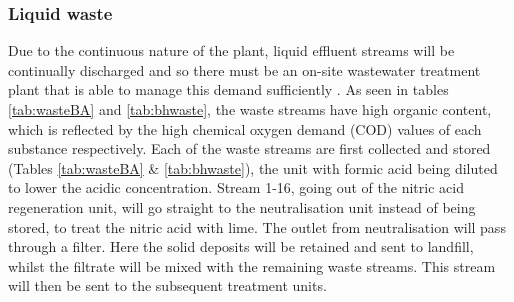 \subsubsection{Liquid waste }

Due to the continuous nature of the plant, liquid effluent streams will be continually discharged and so there must be an on-site wastewater treatment plant that is able to manage this demand sufficiently \cite{water_innovations_inc_continuous_2021}.  As seen in tables \ref{tab:wasteBA} and \ref{tab:bhwaste}, the waste streams have high organic content, which is reflected by the high chemical oxygen demand (COD) values of each substance respectively. Each of the waste streams are first collected and stored (Tables \ref{tab:wasteBA} \& \ref{tab:bhwaste}), the unit with formic acid being diluted to lower the acidic concentration. Stream 1-16, going out of the nitric acid regeneration unit, will go straight to the neutralisation unit instead of being stored, to treat the nitric acid with lime. The outlet from neutralisation will pass through a filter. Here the solid deposits will be retained and sent to landfill, whilst the filtrate will be mixed with the remaining waste streams. This stream will then be sent to the subsequent treatment units. 

